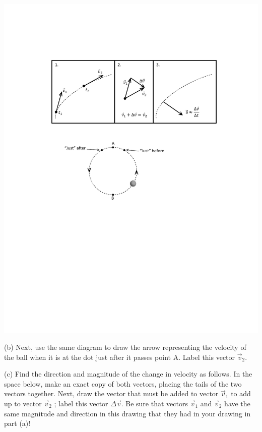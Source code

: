 {\par\centering \includegraphics{circ_motion/circ_motion_fig2_new.pdf} \par}

(b) Next, use the same diagram to draw the arrow representing the velocity of
the ball when it is at the dot just after it passes point A. Label this vector
\(\vec{v} _{2} \).

(c) Find the direction and magnitude of the change in velocity as follows. In
the space below, make an exact copy of both vectors, placing the tails of the
two vectors together. Next, draw the vector that must be added to vector \(\vec{v}_{1} \)
to add up to vector \(\vec{v}_{2} \) ; label this vector \( \Delta  \vec {v}\).
Be sure that vectors \(\vec{v}_{1} \) and \(\vec{v}_{2} \) have the
same magnitude and direction in this drawing that they had in your drawing in
part (a)!
\vspace{30mm}

